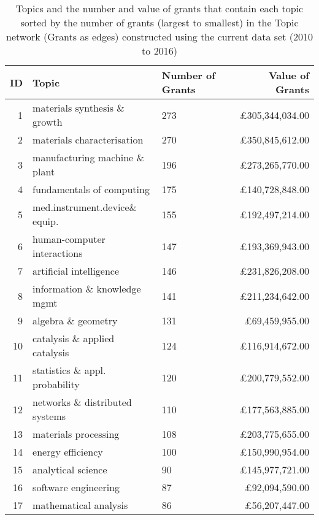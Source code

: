 \begin{spacing}{0.9}
\begin{longtable}[c]{r|>{\raggedleft\arraybackslash}m{6.5cm}|>{\raggedleft\arraybackslash}m{1.9cm}|r}
\caption[Topics and the number and value of grants that contain each topic in the Topic network (Grants as edges) constructed using the current data set (2010 to 2016)]{Topics and the number and value of grants that contain each topic sorted by the number of grants (largest to smallest) in the Topic network (Grants as edges) constructed using the current data set (2010 to 2016)}\\
\label{table:topic_a_current_topics_appendix}
\textbf{ID} & \textbf{Topic} & \textbf{Number of Grants} & \textbf{Value of Grants}\\
\hline
\endhead
{1} & {materials synthesis \& growth} & {273} & {\pounds305,344,034.00}\\
{2} & {materials characterisation} & {270} & {\pounds350,845,612.00}\\
{3} & {manufacturing machine \& plant} & {196} & {\pounds273,265,770.00}\\
{4} & {fundamentals of computing} & {175} & {\pounds140,728,848.00}\\
{5} & {med.instrument.device\& equip.} & {155} & {\pounds192,497,214.00}\\
{6} & {human-computer interactions} & {147} & {\pounds193,369,943.00}\\
{7} & {artificial intelligence} & {146} & {\pounds231,826,208.00}\\
{8} & {information \& knowledge mgmt} & {141} & {\pounds211,234,642.00}\\
{9} & {algebra \& geometry} & {131} & {\pounds69,459,955.00}\\
{10} & {catalysis \& applied catalysis} & {124} & {\pounds116,914,672.00}\\
{11} & {statistics \& appl. probability} & {120} & {\pounds200,779,552.00}\\
{12} & {networks \& distributed systems} & {110} & {\pounds177,563,885.00}\\
{13} & {materials processing} & {108} & {\pounds203,775,655.00}\\
{14} & {energy efficiency} & {100} & {\pounds150,990,954.00}\\
{15} & {analytical science} & {90} & {\pounds145,977,721.00}\\
{16} & {software engineering} & {87} & {\pounds92,094,590.00}\\
{17} & {mathematical analysis} & {86} & {\pounds56,207,447.00}\\

\end{longtable}
\end{spacing}
